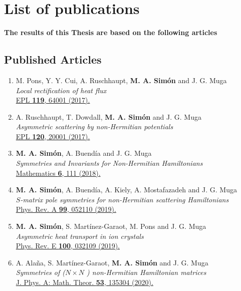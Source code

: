 \chapter{List of publications} %
\label{Publications}
 {\bf The results of this Thesis are based on the following articles}
\section*{Published Articles}

\begin{enumerate}

  \item M. Pons, Y. Y. Cui, A. Ruschhaupt, {\bf M. A. Sim\'{o}n} and J. G. Muga\\
  {\it Local rectification of heat flux}\\
  \href{https://doi.org/10.1209/0295-5075/119/64001}{EPL {\bf 119}, 64001 (2017).}

  \item A. Ruschhaupt, T. Dowdall, {\bf M. A. Sim\'{o}n} and J. G. Muga\\
  {\it Asymmetric scattering by non-Hermitian potentials}\\
  \href{https://doi.org/10.1209/0295-5075/120/20001}{EPL {\bf 120}, 20001 (2017).}

  \item {\bf M. A. Sim\'{o}n}, A. Buend\'{i}a and J. G. Muga\\
  {\it Symmetries and Invariants for Non-Hermitian Hamiltonians}\\
  \href{https://doi.org/10.3390/math6070111}{Mathematics {\bf 6}, 111 (2018).}

  \item {\bf M. A. Sim\'{o}n}, A. Buend\'{i}a, A. Kiely, A. Mostafazadeh and J. G. Muga\\
  {\it $S$-matrix pole symmetries for non-Hermitian scattering Hamiltonians}\\
  \href{https://doi.org/10.1103/PhysRevA.99.052110}{Phys. Rev. A {\bf 99}, 052110 (2019).}

  \item {\bf M. A. Sim\'{o}n}, S. Mart\'{i}nez-Garaot, M. Pons and J. G. Muga\\
  {\it Asymmetric heat transport in ion crystals}\\
  \href{https://doi.org/10.1103/PhysRevE.100.032109}{Phys. Rev. E {\bf 100}, 032109 (2019).}

  \item A. Alaña, S. Mart\'{i}nez-Garaot, {\bf M. A. Sim\'{o}n} and J. G. Muga\\
  {\it Symmetries of (${N \times N}$ ) non-Hermitian Hamiltonian matrices}\\
  \href{https://doi.org/10.1088/1751-8121/ab7781}{J. Phys. A: Math. Theor. {\bf 53}, 135304 (2020).}

\end{enumerate}

